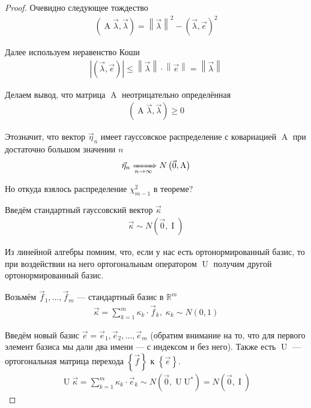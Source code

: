 \begin{proof}
    Очевидно следующее тождество
    \begin{align*}
        \left( \operatorname{A} \vec{\lambda}, \vec{\lambda} \right)
        = \left\| \vec{\lambda} \right\|^2
            - \left( \vec{\lambda}, \vec{e} \right)^2
    \end{align*}

    Далее используем неравенство Коши
    \begin{align*}
        \left| \left( \vec{\lambda}, \vec{e} \right) \right|
        \le \left\| \vec{\lambda} \right\| \cdot \left\| \vec{e} \right\|
        = \left\| \vec{\lambda} \right\|
    \end{align*}

    Делаем вывод, что матрица $\operatorname{A}$ неотрицательно определённая
    \begin{align*}
        \left( \operatorname{A} \vec{\lambda}, \vec{\lambda} \right) \ge 0
    \end{align*}

    Этозначит, что вектор $\vec{\eta}_n$ имеет гауссовское распределение с
    ковариацией $\operatorname{A}$ при достаточно большом значении $n$
    \begin{align*}
        \vec{\eta}_n \xRightarrow[n\to\infty]{} N\left( \vec{0}, \operatorname{A} \right)
    \end{align*}

    Но откуда взялось распределение $\chi_{m-1}^2$ в теореме?

    Введём стандартный гауссовский вектор $\vec{\kappa}$
    \begin{align*}
        \vec{\kappa} \sim N\left( \vec{0}, \operatorname{I} \right)
    \end{align*}

    Из линейной алгебры помним, что, если у нас есть ортонормированный базис,
    то при воздействии на него ортогональным оператором $\operatorname{U}$
    получим другой ортонормированный базис.

    Возьмём $\vec{f}_1, \dots, \vec{f}_m$ --- стандартный базис в
    $\mathbb{R}^m$
    \begin{align*}
        \vec{\kappa} = \sum_{k=1}^{m} \kappa_k \cdot \vec{f}_k,\;
        \kappa_k \sim N\left( 0, 1 \right)
    \end{align*}

    Введём новый базис $\vec{e} = \vec{e}_1, \vec{e}_2, \dots, \vec{e}_m$
    (обратим внимание на то, что для первого элемент базиса мы дали два имени
    --- с индексом и без него). Также есть $\operatorname{U}$ --- ортогональная
    матрица перехода $\left\{ \vec{f} \right\}$ к $\left\{ \vec{e} \right\}$.
    \begin{align*}
        \operatorname{U} \vec{\kappa}
        = \sum_{k=1}^{m} \hat{\kappa}_k \cdot \vec{e}_k
        \sim N\left( \vec{0}, \operatorname{U} \operatorname{U^*} \right)
        = N\left( \vec{0}, \operatorname{I} \right)
    \end{align*}


\end{proof}
